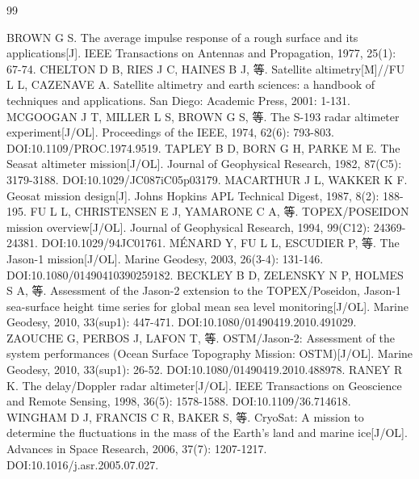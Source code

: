 \documentclass[a4paper]{article}
\newcommand{\song}{\CJKfamily{song}}
\newcommand{\xiaosihao}{\fontsize{12pt}{18pt}\selectfont}
\newcommand\seccontent{
	\song
	\xiaosihao
    \setlength{\parindent}{2em}
    \setlength{\parskip}{0pt}
    }
\begin{document}
\clearpage
{}
{}

% 
% 

\begin{thebibliography}{99}
	\label{bibref}
	\seccontent
	 BROWN G S. The average impulse response of a rough surface and its applications[J]. IEEE Transactions on Antennas and Propagation, 1977, 25(1): 67-74.
	 CHELTON D B, RIES J C, HAINES B J, 等. Satellite altimetry[M]//FU L L, CAZENAVE A. Satellite altimetry and earth sciences: a handbook of techniques and applications. San Diego: Academic Press, 2001: 1-131.
	 MCGOOGAN J T, MILLER L S, BROWN G S, 等. The S-193 radar altimeter experiment[J/OL]. Proceedings of the IEEE, 1974, 62(6): 793-803. DOI:10.1109/PROC.1974.9519.
	 TAPLEY B D, BORN G H, PARKE M E. The Seasat altimeter mission[J/OL]. Journal of Geophysical Research, 1982, 87(C5): 3179-3188. DOI:10.1029/JC087iC05p03179.
	 MACARTHUR J L, WAKKER K F. Geosat mission design[J]. Johns Hopkins APL Technical Digest, 1987, 8(2): 188-195.
	 FU L L, CHRISTENSEN E J, YAMARONE C A, 等. TOPEX/POSEIDON mission overview[J/OL]. Journal of Geophysical Research, 1994, 99(C12): 24369-24381. DOI:10.1029/94JC01761.
	 MÉNARD Y, FU L L, ESCUDIER P, 等. The Jason-1 mission[J/OL]. Marine Geodesy, 2003, 26(3-4): 131-146. DOI:10.1080/01490410390259182.
	 BECKLEY B D, ZELENSKY N P, HOLMES S A, 等. Assessment of the Jason-2 extension to the TOPEX/Poseidon, Jason-1 sea-surface height time series for global mean sea level monitoring[J/OL]. Marine Geodesy, 2010, 33(sup1): 447-471. DOI:10.1080/01490419.2010.491029.
	 ZAOUCHE G, PERBOS J, LAFON T, 等. OSTM/Jason-2: Assessment of the system performances (Ocean Surface Topography Mission: OSTM)[J/OL]. Marine Geodesy, 2010, 33(sup1): 26-52. DOI:10.1080/01490419.2010.488978.
	 RANEY R K. The delay/Doppler radar altimeter[J/OL]. IEEE Transactions on Geoscience and Remote Sensing, 1998, 36(5): 1578-1588. DOI:10.1109/36.714618.
	 WINGHAM D J, FRANCIS C R, BAKER S, 等. CryoSat: A mission to determine the fluctuations in the mass of the Earth's land and marine ice[J/OL]. Advances in Space Research, 2006, 37(7): 1207-1217. DOI:10.1016/j.asr.2005.07.027.

\end{thebibliography}
\end{document}
